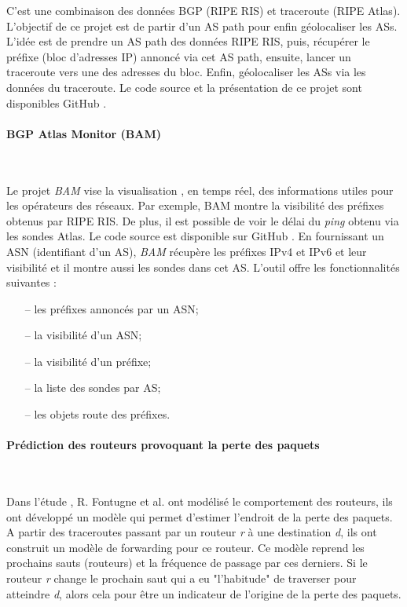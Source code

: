 C'est une combinaison des données BGP (RIPE RIS) et traceroute (RIPE Atlas). L'objectif de ce projet est de partir d'un AS path pour enfin géolocaliser les ASs. 
L'idée est de prendre un AS path des données RIPE RIS, puis, récupérer le préfixe (bloc d'adresses IP) annoncé via cet AS path, ensuite, lancer un traceroute vers une des adresses du bloc. Enfin, géolocaliser les ASs via les données du traceroute. 
Le code source et la présentation de ce projet sont disponibles GitHub \cite{bgp-traceroutes,pres-bgp-traceroute}. 


\paragraph{BGP Atlas Monitor (BAM)} ~

Le projet \textit{BAM} vise la visualisation , en temps réel,  des informations utiles pour les opérateurs des réseaux. Par exemple, BAM montre  la visibilité des préfixes obtenus par RIPE RIS. De plus,  il est possible de voir  le délai du \textit{ping} obtenu via les sondes   Atlas. Le code source est disponible sur  GitHub \cite{bam}. En fournissant un ASN (identifiant d'un AS), \textit{BAM} récupère les préfixes IPv4 et IPv6 et leur visibilité et il montre aussi les sondes dans cet AS. L'outil offre  les  fonctionnalités suivantes :
\begin{itemize}
	\item[--] les préfixes annoncés par un ASN;
	\item[--] la visibilité d'un ASN;
	\item[--] la visibilité d'un préfixe;
	\item[--] la liste des sondes par AS;
	\item[--] les objets  route des préfixes.
\end{itemize}

\paragraph{Prédiction des routeurs provoquant la perte des paquets }~

Dans l'étude \cite{DBLP:journals/corr/FontugneAPB16}, R. Fontugne et al. ont modélisé le comportement  des routeurs, ils ont développé un modèle qui permet d'estimer l'endroit de la  perte des paquets. A partir des traceroutes passant par un routeur \textit{r} à une destination \textit{d}, ils ont construit un modèle de forwarding pour ce routeur. Ce modèle reprend les prochains sauts (routeurs) et la fréquence de passage par ces derniers. Si le routeur \textit{r} change le prochain saut qui a eu "l'habitude" de traverser  pour atteindre \textit{d}, alors cela pour être un indicateur de l'origine  de la perte des paquets.

